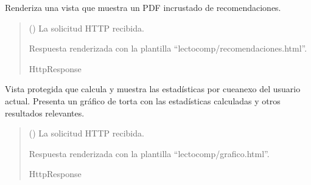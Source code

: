 \documentclass[letterpaper,10pt,spanish]{sphinxmanual}
\begin{document}
\begin{fulllineitems}

\pysigstartsignatures
{}
\pysigstopsignatures
\sphinxAtStartPar
Renderiza una vista que muestra un PDF incrustado de recomendaciones.
\begin{quote}\begin{description}
\sphinxAtStartPar
{} () \textendash{} La solicitud HTTP recibida.

\sphinxAtStartPar
Respuesta renderizada con la plantilla “lectocomp/recomendaciones.html”.

\sphinxAtStartPar
HttpResponse

\end{description}\end{quote}

\end{fulllineitems}



\begin{fulllineitems}

\pysigstartsignatures
{}
\pysigstopsignatures
\sphinxAtStartPar
Vista protegida que calcula y muestra las estadísticas por cueanexo del usuario actual.
Presenta un gráfico de torta con las estadísticas calculadas y otros resultados relevantes.
\begin{quote}\begin{description}
\sphinxAtStartPar
{} () \textendash{} La solicitud HTTP recibida.

\sphinxAtStartPar
Respuesta renderizada con la plantilla “lectocomp/grafico.html”.

\sphinxAtStartPar
HttpResponse

\end{description}\end{quote}

\end{fulllineitems}
\end{document}
